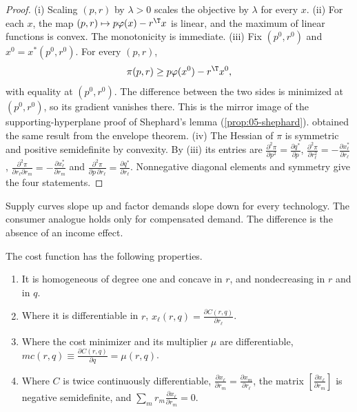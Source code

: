 \begin{proof}
(i) Scaling $(p, r)$ by $\lambda > 0$ scales the objective by $\lambda$ for every $x$. (ii) For each $x$, the map
$(p, r) \mapsto p\varphi(x) - r^\T x$ is linear, and the maximum of linear functions is convex. The
monotonicity is immediate. (iii) Fix $(p^0, r^0)$ and $x^0 = x^*(p^0, r^0)$. For every $(p, r)$,
\begin{equation*}
\pi(p, r) \geq p\varphi(x^0) - r^\T x^0,
\end{equation*}
with equality at $(p^0, r^0)$. The difference between the two sides is minimized at $(p^0, r^0)$, so its
gradient vanishes there. This is the mirror image of the supporting-hyperplane proof of Shephard's lemma
(\cref{prop:05-shephard}).
 obtained the same result from the envelope theorem. (iv) The Hessian of $\pi$ is symmetric and positive
semidefinite by convexity. By (iii) its entries are $\frac{\partial^2\pi}{\partial p^2} = \frac{\partial q^*}{\partial p}$,
$\frac{\partial^2\pi}{\partial r_\ell^2} = -\frac{\partial x^*_\ell}{\partial r_\ell}$,
$\frac{\partial^2\pi}{\partial r_\ell\partial r_m} = -\frac{\partial x^*_\ell}{\partial r_m}$ and
$\frac{\partial^2\pi}{\partial p\,\partial r_\ell} = \frac{\partial q^*}{\partial r_\ell}$. Nonnegative diagonal elements and symmetry
give the four statements.
\end{proof}

Supply curves slope up and factor demands slope down for every technology. The consumer analogue holds only
for compensated demand. The difference is the absence of an income effect.

\begin{proposition}\label{prop:B-cost-fn}
The cost function has the following properties.
\begin{enumerate}[label=(\roman*)]
\item It is homogeneous of degree one and concave in $r$, and nondecreasing in $r$ and in $q$.
\item Where it is differentiable in $r$, $x_\ell(r, q) = \frac{\partial C(r, q)}{\partial r_\ell}$.
\item Where the cost minimizer and its multiplier $\mu$ are differentiable,
  $mc(r, q) \equiv \frac{\partial C(r, q)}{\partial q} = \mu(r, q)$.
\item Where $C$ is twice continuously differentiable, $\frac{\partial x_\ell}{\partial r_m} = \frac{\partial x_m}{\partial r_\ell}$,
  the matrix $\left[\frac{\partial x_\ell}{\partial r_m}\right]$ is negative semidefinite, and
  $\sum_mr_m\frac{\partial x_\ell}{\partial r_m} = 0$.
\end{enumerate}
\end{proposition}

